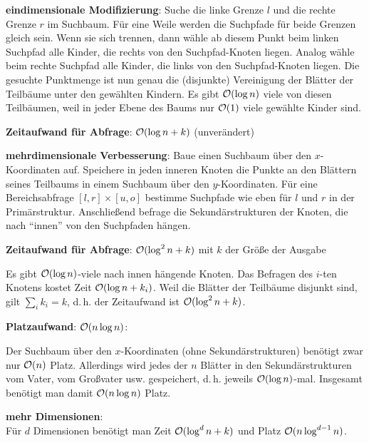 \textbf{eindimensionale Modifizierung}:
Suche die linke Grenze $l$ und die rechte Grenze $r$ im Suchbaum.
Für eine Weile werden die Suchpfade für beide Grenzen gleich sein.
Wenn sie sich trennen, dann wähle ab diesem Punkt beim linken Suchpfad alle Kinder, die
rechts von den Suchpfad-Knoten liegen.
Analog wähle beim rechte Suchpfad alle Kinder, die links von den Suchpfad-Knoten liegen.
Die gesuchte Punktmenge ist nun genau die (disjunkte) Vereinigung der Blätter der Teilbäume
unter den gewählten Kindern.
Es gibt $\mathcal{O}(\log n)$ viele von diesen Teilbäumen, weil in jeder Ebene des Baums nur $\mathcal{O}(1)$ viele
gewählte Kinder sind.

\textbf{Zeitaufwand für Abfrage}:
$\mathcal{O}(\log n + k)$ (unverändert)

\linie
\pagebreak

\textbf{mehrdimensionale Verbesserung}:
Baue einen Suchbaum über den $x$-Koordinaten auf.
Speichere in jeden inneren Knoten die Punkte an den Blättern seines Teilbaums
in einem Suchbaum über den $y$-Koordinaten.
Für eine Bereichsabfrage $[l, r] \times [u, o]$ bestimme Suchpfade wie eben für $l$ und $r$
in der Primärstruktur.
Anschließend befrage die Sekundärstrukturen der Knoten, die nach "`innen"' von den Suchpfaden
hängen.

\textbf{Zeitaufwand für Abfrage}:
$\mathcal{O}(\log^2 n + k)$
mit $k$ der Größe der Ausgabe

\begin{Beweis}
    Es gibt $\mathcal{O}(\log n)$-viele nach innen hängende Knoten.
    Das Befragen des $i$-ten Knotens kostet Zeit $\mathcal{O}(\log n + k_i)$.
    Weil die Blätter der Teilbäume disjunkt sind, gilt $\sum_i k_i = k$,
    d.\,h. der Zeitaufwand ist $\mathcal{O}(\log^2 n + k)$.
\end{Beweis}

\textbf{Platzaufwand}:
$\mathcal{O}(n \log n)$:

\begin{Beweis}
    Der Suchbaum über den $x$-Koordinaten (ohne Sekundärstrukturen) benötigt zwar nur
    $\mathcal{O}(n)$ Platz.
    Allerdings wird jedes der $n$ Blätter in den Sekundärstrukturen vom Vater, vom Großvater usw.
    gespeichert, d.\,h. jeweils $\mathcal{O}(\log n)$-mal.
    Insgesamt benötigt man damit $\mathcal{O}(n \log n)$ Platz.
\end{Beweis}

\linie

\textbf{mehr Dimensionen}:\\
Für $d$ Dimensionen benötigt man Zeit $\mathcal{O}(\log^d n + k)$ und Platz
$\mathcal{O}(n \log^{d-1} n)$.

